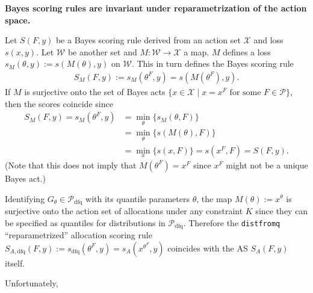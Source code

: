 \documentclass{article}
\begin{document}
\textbf{Bayes scoring rules are invariant under reparametrization of the action space.}

Let $S(F,y)$ be a Bayes scoring rule derived from an action set $\mathcal{X}$ and loss $s(x,y)$.
Let $\mathcal{W}$ be another set and $M:\mathcal{W} \to \mathcal{X}$ a map. $M$ defines a loss $s_M(\theta, y):= s(M(\theta), y)$
on $\mathcal{W}$. This in turn defines the Bayes scoring rule
\begin{align}
S_M(F,y) := s_M(\theta^F,y) = s(M(\theta^F),y).
\end{align}
If $M$ is surjective onto the set of Bayes acts $\{x \in \mathcal{X} \mid x = x^F \text{ for some } F \in \mathcal{P}\}$, then the scores coincide since
\begin{align}
S_M(F,y) = s_M(\theta^F,y) & = \min_{\theta}\{s_M(\theta,F)\} \\
&= \min_{\theta}\{s(M(\theta),F)\}  \\
&= \min_{x}\{s(x,F)\} = s(x^F,F) = S(F,y).
\end{align}
(Note that this does not imply that $M(\theta^F) = x^F$ since $x^F$ might not be a unique Bayes act.)

Identifying $G_{\theta}\in \mathcal{P}_{\mathrm{dfq}}$ with its quantile parameters $\theta$, the map $M(\theta):= x^{\theta}$
is surjective onto the action set of allocations under any constraint $K$ since they can be specified as quantiles for
distributions in $\mathcal{P}_{\mathrm{dfq}}$.  Therefore
the \verb`distfromq` ``reparametrized'' allocation scoring rule
$S_{A, \mathrm{dfq}}(F,y):= s_{\mathrm{dfq}}(\theta^F,y) = s_A(x^{\theta^F},y)$ coincides with the AS $S_A(F,y)$ itself.

Unfortunately,
\end{document}
